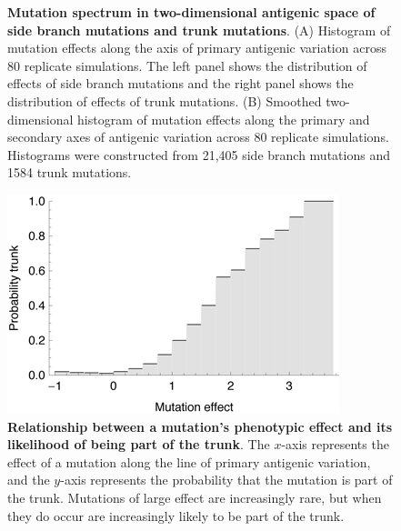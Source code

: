 \pagebreak

\begin{figure}[!c]
	\centering
	\caption{\textbf{Mutation spectrum in two-dimensional antigenic space of side branch mutations and trunk mutations}. (A) Histogram of mutation effects along the axis of primary antigenic variation across 80 replicate simulations.  The left panel shows the distribution of effects of side branch mutations and the right panel shows the distribution of effects of trunk mutations. (B) Smoothed two-dimensional histogram of mutation effects along the primary and secondary axes of antigenic variation across 80 replicate simulations.  Histograms were constructed from 21,405 side branch mutations and 1584 trunk mutations.}
	\label{mutspectrum}
\end{figure}

\pagebreak

\begin{figure}[!c]
	\centering
	\includegraphics{figures/probtrunk}
	\caption{\textbf{Relationship between a mutation's phenotypic effect and its likelihood of being part of the trunk}. The $x$-axis represents the effect of a mutation along the line of primary antigenic variation, and the $y$-axis represents the probability that the mutation is part of the trunk.  Mutations of large effect are increasingly rare, but when they do occur are increasingly likely to be part of the trunk.}
	\label{probtrunk}
\end{figure}


